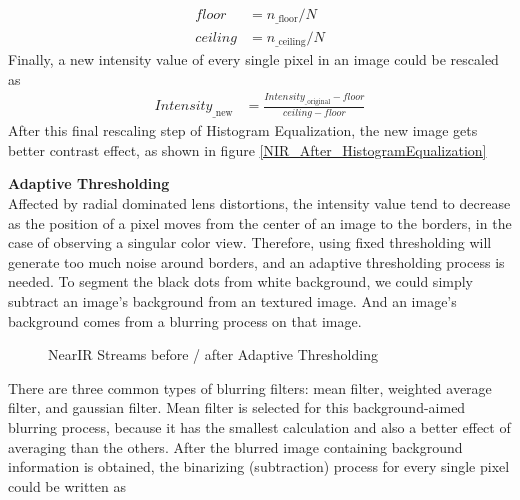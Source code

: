 %
\begin{equation}
%
\begin{aligned}
floor &=  n_{\text{\_floor}} / N%
\\%
ceiling &=  n_{\text{\_ceiling}} / N
\end{aligned}
\label{intensityFloorCeilingDetermination}
%
\end{equation}%
%
Finally, a new intensity value of every single pixel in an image could be rescaled as
%
\begin{equation}
%
\begin{aligned}
Intensity_{\text{\_new}} &= \frac{Intensity_{\text{\_original}} - floor}{ceiling - floor} 
\end{aligned}
%
\end{equation}%
%
After this final rescaling step of Histogram Equalization, the new image gets better contrast effect, as shown in figure \ref{NIR_After_HistogramEqualization}%
\\\par%
 \qquad \textbf{Adaptive Thresholding}\\%
Affected by radial dominated lens distortions, the intensity value tend to decrease as the position of a pixel moves from the center of an image to the borders, in the case of observing a singular color view. Therefore, using fixed thresholding will generate too much noise around borders, and an adaptive thresholding process is needed. To segment the black dots from white background, we could simply subtract an image's background from an textured image. And an image's background comes from a blurring process on that image. \par%
%
 \begin{figure}[h]
\hspace*{-0.5cm}
\centering
{}
\caption{NearIR Streams before / after Adaptive Thresholding}
\label{Adaptive_Thresholding}
\end{figure}%
\par%
%
There are three common types of blurring filters: mean filter, weighted average filter, and gaussian filter. Mean filter is selected for this background-aimed blurring process, because it has the smallest calculation and also a better effect of averaging than the others. After the blurred image containing background information is obtained, the binarizing (subtraction) process for every single pixel could be written as

